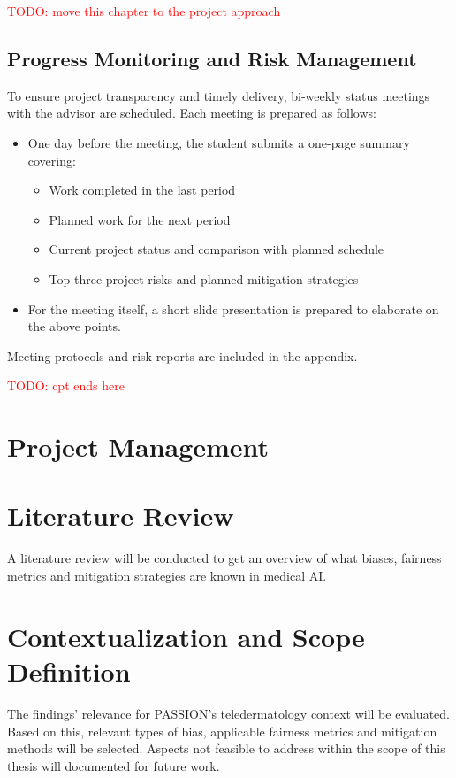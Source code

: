 \documentclass[12pt, a4paper, oneside]{book}   	%
\renewcommand{\todo}[1]{\textcolor{red}{TODO: #1}}
\begin{document}
		\todo{move this chapter to the project approach}
		\subsection{Progress Monitoring and Risk Management}
		To ensure project transparency and timely delivery, bi-weekly status meetings with the advisor are scheduled. Each meeting is prepared as follows:
		
		\begin{itemize}
			\item One day before the meeting, the student submits a one-page summary covering:
			\begin{itemize}
				\item Work completed in the last period
				\item Planned work for the next period
				\item Current project status and comparison with planned schedule
				\item Top three project risks and planned mitigation strategies
			\end{itemize}
			\item For the meeting itself, a short slide presentation is prepared to elaborate on the above points.
		\end{itemize}
		
		Meeting protocols and risk reports are included in the appendix.
		
		
		\todo{cpt ends here}
		
		\section{Project Management}
		
		
		
		\section{Literature Review}
		A literature review will be conducted to get an overview of what biases, fairness metrics and mitigation strategies are known in medical \gls{AI}.
			
		\section{Contextualization and Scope Definition}
		The findings' relevance for PASSION's \gls{teledermatology} context will be evaluated. Based on this, relevant types of bias, applicable fairness metrics and mitigation methods will be selected. Aspects not feasible to address within the scope of this thesis will documented for future work.
			
\end{document}
